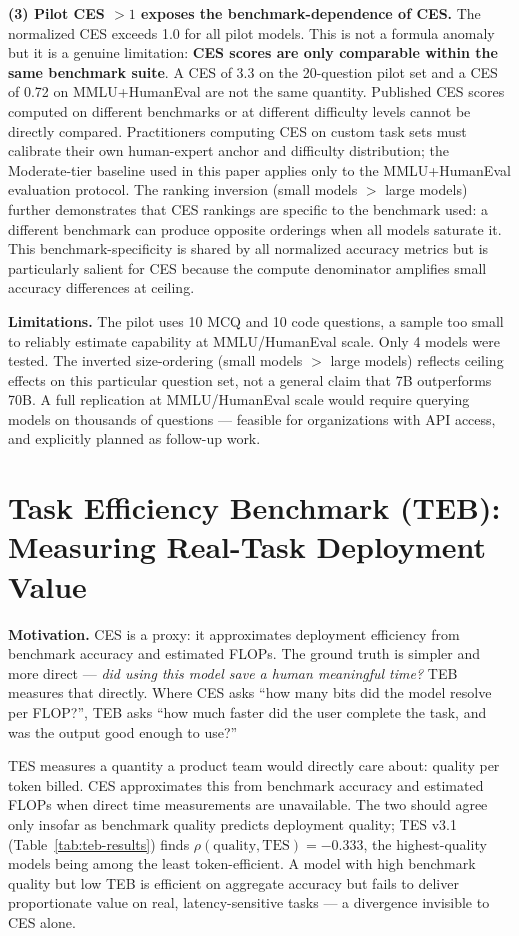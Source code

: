 \documentclass[12pt]{article}
\begin{document}
\textbf{(3) Pilot CES $> 1$ exposes the benchmark-dependence of CES.} The normalized CES exceeds 1.0 for all pilot models. This is not a formula anomaly but it is a genuine limitation: \textbf{CES scores are only comparable within the same benchmark suite}. A CES of 3.3 on the 20-question pilot set and a CES of 0.72 on MMLU+HumanEval are not the same quantity. Published CES scores computed on different benchmarks or at different difficulty levels cannot be directly compared. Practitioners computing CES on custom task sets must calibrate their own human-expert anchor and difficulty distribution; the Moderate-tier baseline used in this paper applies only to the MMLU+HumanEval evaluation protocol. The ranking inversion (small models $>$ large models) further demonstrates that CES rankings are specific to the benchmark used: a different benchmark can produce opposite orderings when all models saturate it. This benchmark-specificity is shared by all normalized accuracy metrics but is particularly salient for CES because the compute denominator amplifies small accuracy differences at ceiling.

\textbf{Limitations.} The pilot uses 10 MCQ and 10 code questions, a sample too small to reliably estimate capability at MMLU/HumanEval scale. Only 4 models were tested. The inverted size-ordering (small models $>$ large models) reflects ceiling effects on this particular question set, not a general claim that 7B outperforms 70B. A full replication at MMLU/HumanEval scale would require querying models on thousands of questions --- feasible for organizations with API access, and explicitly planned as follow-up work.

\section{Task Efficiency Benchmark (TEB): Measuring Real-Task Deployment Value}
\label{sec:teb}

\textbf{Motivation.} CES is a proxy: it approximates deployment efficiency from benchmark accuracy and estimated FLOPs. The ground truth is simpler and more direct --- \textit{did using this model save a human meaningful time?} TEB measures that directly. Where CES asks ``how many bits did the model resolve per FLOP?'', TEB asks ``how much faster did the user complete the task, and was the output good enough to use?''

TES measures a quantity a product team would directly care about: quality per token billed. CES approximates this from benchmark accuracy and estimated FLOPs when direct time measurements are unavailable. The two should agree only insofar as benchmark quality predicts deployment quality; TES v3.1 (Table~\ref{tab:teb-results}) finds $\rho(\text{quality}, \text{TES}) = -0.333$, the highest-quality models being among the least token-efficient. A model with high benchmark quality but low TEB is efficient on aggregate accuracy but fails to deliver proportionate value on real, latency-sensitive tasks --- a divergence invisible to CES alone.
\end{document}
